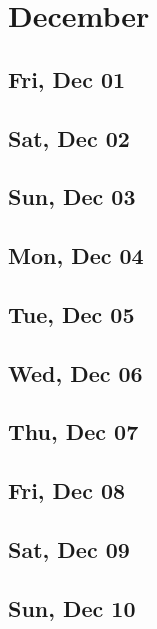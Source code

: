 \chapter{December}
	\section{Fri, Dec 01}
		
	\section{Sat, Dec 02}
		
	\section{Sun, Dec 03}
		
	\section{Mon, Dec 04}
		
	\section{Tue, Dec 05}
		
	\section{Wed, Dec 06}
		
	\section{Thu, Dec 07}
		
	\section{Fri, Dec 08}
		
	\section{Sat, Dec 09}
		
	\section{Sun, Dec 10}
		
